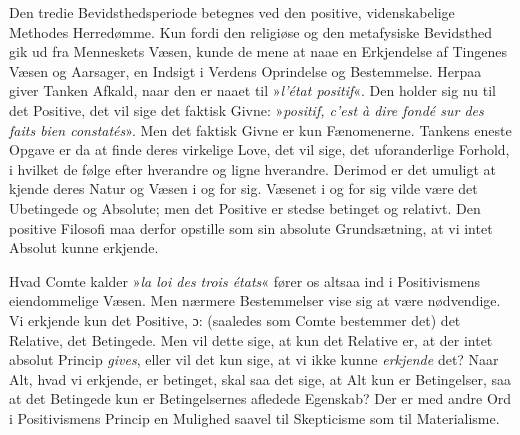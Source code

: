 \documentclass[12pt,a4paper,openany]{book}
\newcommand{\opage}[1]{\marginnote{\footnotesize\textit{[#1]}}}
\begin{document}
Den tredie Bevidsthedsperiode betegnes ved den positive,
videnskabelige Methodes Herredømme. Kun fordi den religiøse
og den metafysiske Bevidsthed gik ud fra Menneskets
Væsen, kunde de mene at naae en Erkjendelse af Tingenes
Væsen og Aarsager, en Indsigt i Verdens Oprindelse og
Bestemmelse. Herpaa giver Tanken Afkald, naar den er
naaet til »\textit{l'état positif}«. Den holder sig nu til det Positive,
det vil sige det faktisk Givne: »\textit{positif, c'est à dire
fondé sur des faits bien constatés}». Men det faktisk Givne
er kun Fænomenerne. Tankens eneste Opgave er da at
finde deres virkelige Love, det vil sige, det uforanderlige Forhold,
i hvilket de følge efter hverandre og ligne hverandre.
Derimod er det umuligt at kjende deres Natur og Væsen i
og for sig. Væsenet i og for sig vilde være det Ubetingede
og Absolute; men det Positive er stedse betinget og relativt.
Den positive Filosofi maa derfor opstille som sin absolute
Grundsætning, at vi intet Absolut kunne erkjende.

Hvad Comte kalder »\textit{la loi des trois états}« fører os altsaa
ind i Positivismens eiendommelige Væsen. Men nærmere Bestemmelser
vise sig at være nødvendige. Vi erkjende kun det Positive,
ɔ: (saaledes som Comte bestemmer det) det Relative, det Betingede.
Men vil dette sige, at kun det Relative er, at der intet
absolut Princip \emph{gives}, eller vil det kun sige, at vi ikke kunne
\emph{erkjende} det? Naar Alt, hvad vi erkjende, er betinget, skal
saa det sige, at Alt kun er Betingelser, saa at det Betingede
kun er Betingelsernes afledede Egenskab? Der er med andre
\opage{202}Ord i Positivismens Princip en Mulighed saavel til Skepticisme
som til Materialisme.
\end{document}
